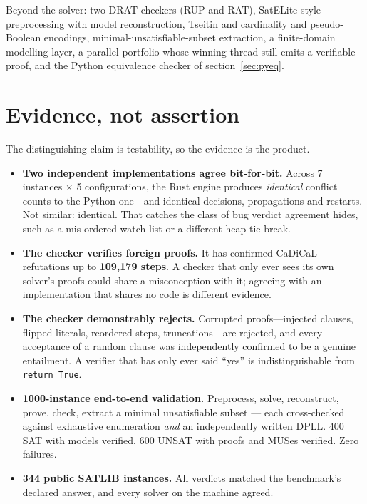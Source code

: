 \documentclass[11pt,a4paper]{article}
\begin{document}
Beyond the solver: two DRAT checkers (RUP and RAT), SatELite-style
preprocessing with model reconstruction, Tseitin and cardinality and
pseudo-Boolean encodings, minimal-unsatisfiable-subset extraction, a
finite-domain modelling layer, a parallel portfolio whose winning thread still
emits a verifiable proof, and the Python equivalence checker of
section~\ref{sec:pyeq}.

\section{Evidence, not assertion}

The distinguishing claim is testability, so the evidence is the product.

\begin{itemize}
  \item \textbf{Two independent implementations agree bit-for-bit.} Across
        7 instances $\times$ 5 configurations, the Rust engine produces
        \emph{identical} conflict counts to the Python one---and identical
        decisions, propagations and restarts. Not similar: identical. That
        catches the class of bug verdict agreement hides, such as a mis-ordered
        watch list or a different heap tie-break.
  \item \textbf{The checker verifies foreign proofs.} It has confirmed
        CaDiCaL refutations up to \textbf{109{,}179 steps}. A checker that only
        ever sees its own solver's proofs could share a misconception with it;
        agreeing with an implementation that shares no code is different
        evidence.
  \item \textbf{The checker demonstrably rejects.} Corrupted proofs---injected
        clauses, flipped literals, reordered steps, truncations---are rejected,
        and every acceptance of a random clause was independently confirmed to
        be a genuine entailment. A verifier that has only ever said ``yes'' is
        indistinguishable from \texttt{return True}.
  \item \textbf{1000-instance end-to-end validation.} Preprocess, solve,
        reconstruct, prove, check, extract a minimal unsatisfiable subset ---
        each cross-checked against exhaustive enumeration \emph{and} an
        independently written DPLL. 400 SAT with models verified, 600 UNSAT
        with proofs and MUSes verified. Zero failures.
  \item \textbf{344 public SATLIB instances.} All verdicts matched the
        benchmark's declared answer, and every solver on the machine agreed.

\end{itemize}
\end{document}
